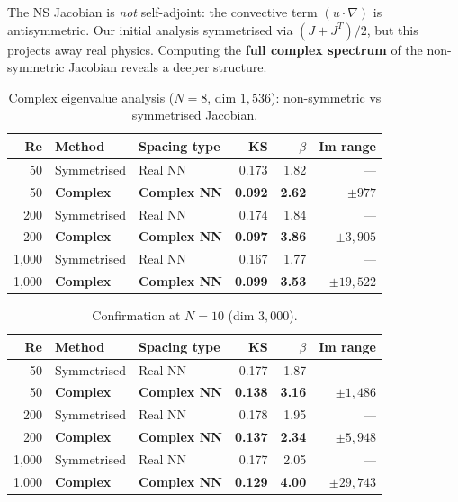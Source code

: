 \documentclass[11pt,a4paper]{article}
\theoremstyle{plain}
\theoremstyle{definition}
\theoremstyle{remark}
\begin{document}
The NS Jacobian is \emph{not} self-adjoint: the convective term $(u \cdot \nabla)$ is antisymmetric. Our initial analysis symmetrised via $(J + J^T)/2$, but this projects away real physics. Computing the \textbf{full complex spectrum} of the non-symmetric Jacobian reveals a deeper structure.

\begin{table}[H]
\centering
\caption{Complex eigenvalue analysis ($N = 8$, dim $1{,}536$): non-symmetric vs symmetrised Jacobian.}
\begin{tabular}{rllrrr}
\toprule
Re & Method & Spacing type & KS & $\beta$ & Im range \\
\midrule
50 & Symmetrised & Real NN & 0.173 & 1.82 & --- \\
50 & \textbf{Complex} & \textbf{Complex NN} & \textbf{0.092} & \textbf{2.62} & $\pm 977$ \\
\midrule
200 & Symmetrised & Real NN & 0.174 & 1.84 & --- \\
200 & \textbf{Complex} & \textbf{Complex NN} & \textbf{0.097} & \textbf{3.86} & $\pm 3{,}905$ \\
\midrule
1{,}000 & Symmetrised & Real NN & 0.167 & 1.77 & --- \\
1{,}000 & \textbf{Complex} & \textbf{Complex NN} & \textbf{0.099} & \textbf{3.53} & $\pm 19{,}522$ \\
\bottomrule
\end{tabular}
\end{table}

\begin{table}[H]
\centering
\caption{Confirmation at $N = 10$ (dim $3{,}000$).}
\begin{tabular}{rllrrr}
\toprule
Re & Method & Spacing type & KS & $\beta$ & Im range \\
\midrule
50 & Symmetrised & Real NN & 0.177 & 1.87 & --- \\
50 & \textbf{Complex} & \textbf{Complex NN} & \textbf{0.138} & \textbf{3.16} & $\pm 1{,}486$ \\
\midrule
200 & Symmetrised & Real NN & 0.178 & 1.95 & --- \\
200 & \textbf{Complex} & \textbf{Complex NN} & \textbf{0.137} & \textbf{2.34} & $\pm 5{,}948$ \\
\midrule
1{,}000 & Symmetrised & Real NN & 0.177 & 2.05 & --- \\
1{,}000 & \textbf{Complex} & \textbf{Complex NN} & \textbf{0.129} & \textbf{4.00} & $\pm 29{,}743$ \\
\bottomrule
\end{tabular}
\end{table}
\end{document}
